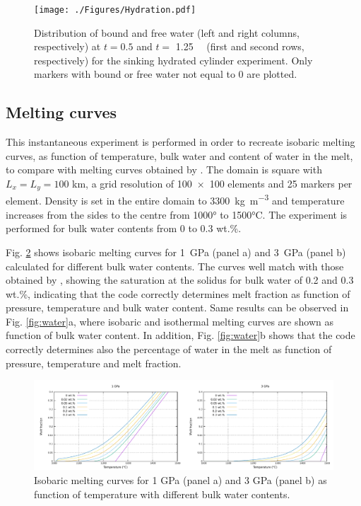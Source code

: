 \documentclass[hidelinks,10pt,a4paper]{article}
\begin{document}
{\begin{figure}
\centering
\noindent\texttt{[image: ./Figures/Hydration.pdf]}
\caption{Distribution of bound and free water (left and right columns, respectively) at $t=0.5$ and $t=$ \SI{1.25}{\mega\year} (first and second rows,
respectively) for the sinking hydrated cylinder experiment. Only markers with bound or free water not equal to 0 are plotted.}
\label{fig:quinquis}
\end{figure}

\subsection{Melting curves}\label{sec:katz}
This instantaneous experiment is performed in order to recreate isobaric melting curves, as function of temperature, bulk water and content of water in the
melt, to compare with melting curves obtained by \citet{Katz2003}. The domain is square with $L_x=L_y=100$ km, a grid resolution of \num{100x100} elements and
25 markers per element. Density is set in the entire domain to \SI{3300}{\kg\per\cubic\m} and temperature increases from the sides to the centre from 1000° to
1500°C. The experiment is performed for bulk water contents from 0 to 0.3 wt.\%.

Fig. \ref{fig:fraction} shows isobaric melting curves for \SI{1}{\giga\pascal} (panel a) and \SI{3}{\giga\pascal} (panel b) calculated for different bulk water
contents. The curves well match with those obtained by \citet{Katz2003}, showing the saturation at the solidus for bulk water of 0.2 and 0.3 wt.\%, indicating
that the code correctly determines melt fraction as function of pressure, temperature and bulk water content. Same results can be observed in Fig.
\ref{fig:water}a, where isobaric and isothermal melting curves are shown as function of bulk water content. In addition, Fig. \ref{fig:water}b shows that the
code correctly determines also the percentage of water in the melt as function of pressure, temperature and melt fraction.

\begin{figure}
\noindent\includegraphics[width=\textwidth]{./Figures/Fraction.pdf}
\caption{Isobaric melting curves for 1 GPa (panel a) and 3 GPa (panel b) as function of temperature with different bulk water contents.}
\label{fig:fraction}
\end{figure}

}
\end{document}
